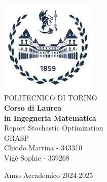 \begin{titlepage}
    
    \begin{center}
    \includegraphics[width=0.35\textwidth]{img/logo_polito_2021.jpg}\\[1cm] 
    {\huge POLITECNICO DI TORINO}\\[1.5cm]
    \textbf{Corso di Laurea\\in Ingegneria Matematica}\\[3cm]
    
     
    {\huge Report Stochastic Optimization}\\[1cm]
    {\huge GRASP}\\[1cm]
    {\large Chiodo Martina - 343310 \\
    Vigè Sophie - 339268}
    
    
    
    \vfill
    
    Anno Accademico 2024-2025
    \end{center}
    
    \restoregeometry
    
    \end{titlepage}